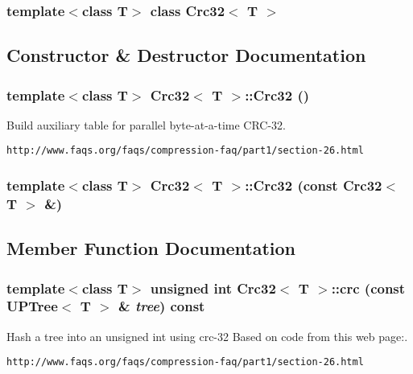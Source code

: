 \subsubsection*{template$<$class T$>$ class Crc32$<$ T $>$}



\subsection{Constructor \& Destructor Documentation}
\subsubsection{\setlength{\rightskip}{0pt plus 5cm}template$<$class T$>$ {\bf Crc32}$<$ T $>$::{\bf Crc32} ()\hspace{0.3cm}{\tt  [private]}}\label{classCrc32_d0}


Build auxiliary table for parallel byte-at-a-time CRC-32. 

{\tt http://www.faqs.org/faqs/compression-faq/part1/section-26.html} 
\subsubsection{\setlength{\rightskip}{0pt plus 5cm}template$<$class T$>$ {\bf Crc32}$<$ T $>$::{\bf Crc32} (const {\bf Crc32}$<$ T $>$ \&)\hspace{0.3cm}{\tt  [private]}}\label{classCrc32_d1}




\subsection{Member Function Documentation}
\subsubsection{\setlength{\rightskip}{0pt plus 5cm}template$<$class T$>$ unsigned int {\bf Crc32}$<$ T $>$::crc (const {\bf UPTree}$<$ T $>$ \& {\em tree}) const}\label{classCrc32_a0}


Hash a tree into an unsigned int using crc-32 Based on code from this web page:. 

{\tt http://www.faqs.org/faqs/compression-faq/part1/section-26.html} 
